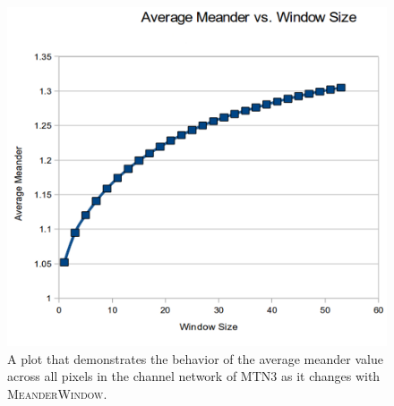 \begin{figure}[t]
\centering
\begin{minipage}[b]{0.9\linewidth}
\begin{center}
\includegraphics[width=\linewidth]{images/AverageMeander_mtn3_CROPPED.png}
\end{center}
\end{minipage}
\caption[Plot of average meander vs. $\textsc{MeanderWindow}$]{\label{figure:AverageMeander} A plot that demonstrates the behavior of the average meander value across all pixels in the channel network of MTN3 as it changes with \textsc{MeanderWindow}. 
}
\end{figure}

